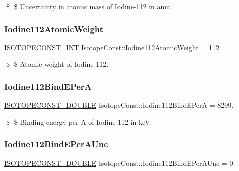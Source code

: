 \$ \$ Uncertainty in atomic mass of Iodine-\/112 in amu. \mbox{\label{group___isotope_const-_iodine-_i112_gae15b6adbc18408532058028fcef65c13}} 
\subsubsection{\texorpdfstring{Iodine112\+Atomic\+Weight}{Iodine112AtomicWeight}}
{\footnotesize\ttfamily \mbox{\hyperlink{group___isotope_const-_macros_ga5f18360b3e99483a35c32d789e62621c}{I\+S\+O\+T\+O\+P\+E\+C\+O\+N\+S\+T\+\_\+\+I\+NT}} Isotope\+Const\+::\+Iodine112\+Atomic\+Weight = 112}

\$ \$ Atomic weight of Iodine-\/112. \mbox{\label{group___isotope_const-_iodine-_i112_ga8258211e6bb6981009f2f5ad34f6a6b5}} 
\subsubsection{\texorpdfstring{Iodine112\+Bind\+E\+PerA}{Iodine112BindEPerA}}
{\footnotesize\ttfamily \mbox{\hyperlink{group___isotope_const-_macros_ga8f45a7272ce02c0b4c65c44636ed719a}{I\+S\+O\+T\+O\+P\+E\+C\+O\+N\+S\+T\+\_\+\+D\+O\+U\+B\+LE}} Isotope\+Const\+::\+Iodine112\+Bind\+E\+PerA = 8299.}

\$ \$ Binding energy per A of Iodine-\/112 in keV. \mbox{\label{group___isotope_const-_iodine-_i112_ga119e05d815c053345eb35996bb434311}} 
\subsubsection{\texorpdfstring{Iodine112\+Bind\+E\+Per\+A\+Unc}{Iodine112BindEPerAUnc}}
{\footnotesize\ttfamily \mbox{\hyperlink{group___isotope_const-_macros_ga8f45a7272ce02c0b4c65c44636ed719a}{I\+S\+O\+T\+O\+P\+E\+C\+O\+N\+S\+T\+\_\+\+D\+O\+U\+B\+LE}} Isotope\+Const\+::\+Iodine112\+Bind\+E\+Per\+A\+Unc = 0.}

